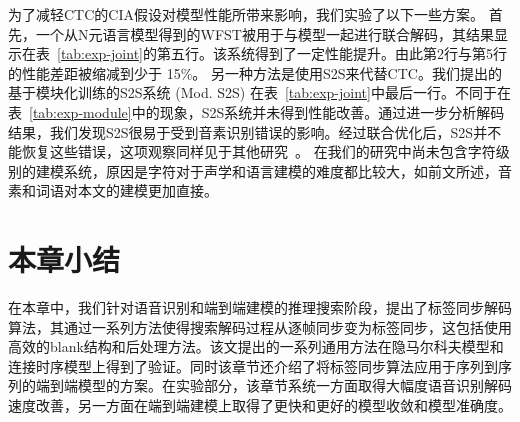 为了减轻CTC的CIA假设对模型性能所带来影响，我们实验了以下一些方案。
首先，一个从N元语言模型得到的WFST被用于与模型一起进行联合解码，其结果显示在表~\ref{tab:exp-joint}的第五行。该系统得到了一定性能提升。由此第2行与第5行的性能差距被缩减到少于 15\%。
%
另一种方法是使用S2S来代替CTC。我们提出的基于模块化训练的S2S系统 (Mod. S2S) 在表~\ref{tab:exp-joint}中最后一行。不同于在表~\ref{tab:exp-module}中的现象，S2S系统并未得到性能改善。通过进一步分析解码结果，我们发现S2S很易于受到音素识别错误的影响。经过联合优化后，S2S并不能恢复这些错误，这项观察同样见于其他研究~\cite{prabhavalkar2017comparison}。
在我们的研究中尚未包含字符级别的建模系统，原因是字符对于声学和语言建模的难度都比较大，如前文所述，音素和词语对本文的建模更加直接。



\section{本章小结}
\label{chap:lsd-sum}

在本章中，我们针对语音识别和端到端建模的推理搜索阶段，提出了标签同步解码算法，其通过一系列方法使得搜索解码过程从逐帧同步变为标签同步，这包括使用高效的blank结构和后处理方法。该文提出的一系列通用方法在隐马尔科夫模型和连接时序模型上得到了验证。同时该章节还介绍了将标签同步算法应用于序列到序列的端到端模型的方案。在实验部分，该章节系统一方面取得大幅度语音识别解码速度改善，另一方面在端到端建模上取得了更快和更好的模型收敛和模型准确度。
